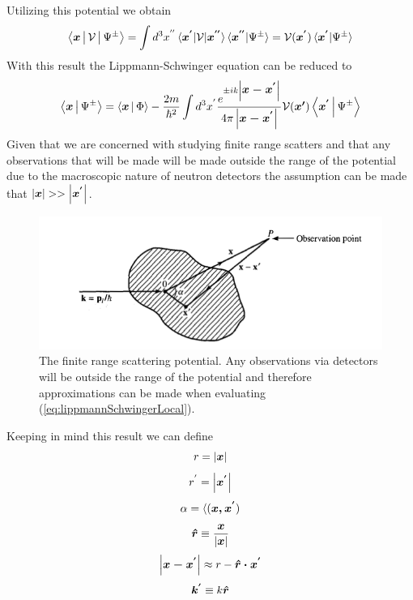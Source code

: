 Utilizing this potential we obtain 
\begin{equation}
\label{eq:localPotentialResult}
\Braket{\mbox{\boldmath$x$}|\mathcal{V}|\Psi^{\pm}}=\int d^3x^{''} \braket{\mbox{\boldmath$x^{'}$}|\mathcal{V}|\mbox{\boldmath$x^{''}$}} \braket{\mbox{\boldmath$x^{''}$}|\Psi^{\pm}}=\mathcal{V}(\mbox{\boldmath$x^{'}$})\braket{\mbox{\boldmath$x^{'}$}|\Psi^{\pm}}
\end{equation}
With this result the Lippmann-Schwinger equation can be reduced to
\begin{equation}
\label{eq:lippmannSchwingerLocal}
 \Braket{\mbox{\boldmath$x$}|\Psi^{\pm}}=\Braket{\mbox{\boldmath$x$}|\Phi} -\frac{2m}{\hbar^2} \int d^3x^{'} \frac{e^{\pm ik\left|\mbox{\boldmath$x-x^{'}$}\right|}}{ 4\pi \left| \mbox{\boldmath$x-x^{'}$} \right|} \mathcal{V}(\mbox{\boldmath$x{'}$})\Braket{\mbox{\boldmath$x^{'}$}|\Psi^{\pm}}
\end{equation}
Given that we are concerned with studying finite range scatters and that any observations that will be made will be made outside the range of the potential due to the macroscopic nature of neutron detectors the assumption can be made that $\left|\mbox{\boldmath$x$}\right| >>\left|\mbox{\boldmath$x^{'}$}\right|$. 
\begin{figure}[ht!]
\centering
\includegraphics[scale=0.5]{Figures/scatteringObservation.png}
\caption{The finite range scattering potential. Any observations via detectors will be outside the range of the potential and therefore approximations can be made when evaluating (\ref{eq:lippmannSchwingerLocal}).}
\label{finiteRangePotential}
\end{figure}

Keeping in mind this result we can define 
$$ r = \left| \mbox{\boldmath$x$} \right| $$
$$r^{'}=\left|\mbox{\boldmath$x^{'}$}\right|$$
$$\alpha = \langle(\mbox{\boldmath$x,x^{'}$})$$
$$\mbox{\boldmath$\hat{r}$} \equiv \frac{\mbox{\boldmath$x$}}{\left|\mbox{\boldmath$x$}\right|}$$
$$\left|\mbox{\boldmath$x-x^{'}$}\right| \approx r-\mbox{\boldmath$\hat{r}\cdot x^{'}$}$$
$$\mbox{\boldmath$k^{'}$} \equiv k\mbox{\boldmath$\hat{r}$}$$

